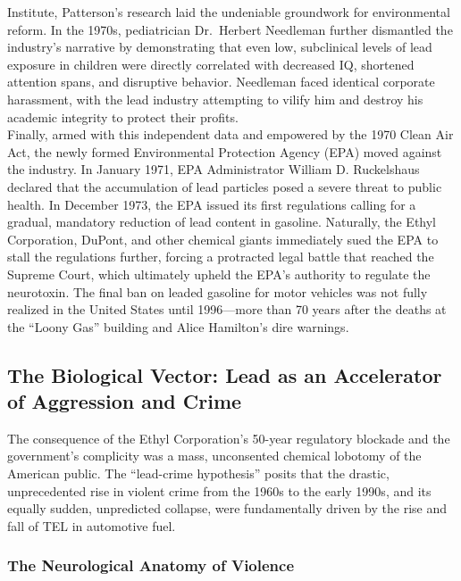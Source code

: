 \documentclass[
]{article}
\begin{document}
Institute, Patterson's research laid the undeniable groundwork for
environmental reform. In the 1970s, pediatrician Dr.~Herbert Needleman
further dismantled the industry's narrative by demonstrating that even
low, subclinical levels of lead exposure in children were directly
correlated with decreased IQ, shortened attention spans, and disruptive
behavior. Needleman faced identical corporate harassment, with the lead
industry attempting to vilify him and destroy his academic integrity to
protect their profits.\\
Finally, armed with this independent data and empowered by the 1970
Clean Air Act, the newly formed Environmental Protection Agency (EPA)
moved against the industry. In January 1971, EPA Administrator William
D. Ruckelshaus declared that the accumulation of lead particles posed a
severe threat to public health. In December 1973, the EPA issued its
first regulations calling for a gradual, mandatory reduction of lead
content in gasoline. Naturally, the Ethyl Corporation, DuPont, and other
chemical giants immediately sued the EPA to stall the regulations
further, forcing a protracted legal battle that reached the Supreme
Court, which ultimately upheld the EPA's authority to regulate the
neurotoxin. The final ban on leaded gasoline for motor vehicles was not
fully realized in the United States until 1996---more than 70 years
after the deaths at the ``Loony Gas'' building and Alice Hamilton's dire
warnings.

\subsection{\texorpdfstring{\textbf{The Biological Vector: Lead as an
Accelerator of Aggression and
Crime}}{The Biological Vector: Lead as an Accelerator of Aggression and Crime}}\label{the-biological-vector-lead-as-an-accelerator-of-aggression-and-crime}

The consequence of the Ethyl Corporation's 50-year regulatory blockade
and the government's complicity was a mass, unconsented chemical
lobotomy of the American public. The ``lead-crime hypothesis'' posits
that the drastic, unprecedented rise in violent crime from the 1960s to
the early 1990s, and its equally sudden, unpredicted collapse, were
fundamentally driven by the rise and fall of TEL in automotive fuel.

\subsubsection{\texorpdfstring{\textbf{The Neurological Anatomy of
Violence}}{The Neurological Anatomy of Violence}}\label{the-neurological-anatomy-of-violence}
\end{document}
